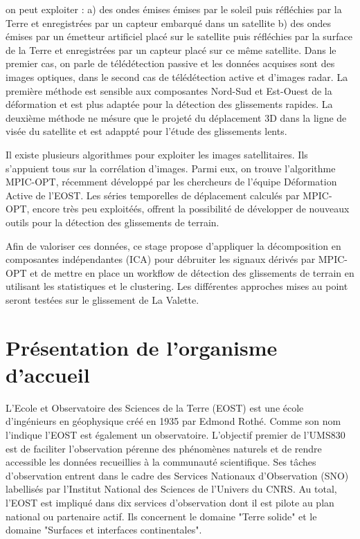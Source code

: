 \documentclass[11pt, openany]{report}
\begin{document}
on peut exploiter : a) des ondes émises émises par le soleil puis réfléchies par la Terre et enregistrées par un capteur embarqué dans un satellite b) des ondes émises par un émetteur artificiel placé sur le satellite puis réfléchies par la surface de la Terre et enregistrées par un capteur placé sur ce même satellite. Dans le premier cas, on parle de télédétection passive et les données acquises sont des images optiques, dans le second cas de télédétection active et d’images radar. La première méthode est sensible aux composantes Nord-Sud et Est-Ouest de la déformation et est plus adaptée pour la détection des glissements rapides. La deuxième méthode ne mésure que le projeté du déplacement 3D dans la ligne de visée du satellite et est adappté pour l'étude des glissements lents.

Il existe plusieurs algorithmes pour exploiter les images satellitaires. Ils s'appuient tous sur la corrélation d'images. Parmi eux, on trouve l'algorithme MPIC-OPT, récemment développé par les chercheurs de l'équipe Déformation Active de l'EOST. Les séries temporelles de déplacement calculés par MPIC-OPT, encore très peu exploitéés, offrent la possibilité de développer de nouveaux outils pour la détection des glissements de terrain.

Afin de valoriser ces données, ce stage propose d'appliquer la décomposition en composantes indépendantes (ICA) pour débruiter les signaux dérivés par MPIC-OPT et de mettre en place un workflow de détection des glissements de terrain en utilisant les statistiques et le clustering. Les différentes approches mises au point seront testées sur le glissement de La Valette.

\chapter{Présentation de l'organisme d'accueil}
L'Ecole et Observatoire des Sciences de la Terre (EOST) est une école d'ingénieurs en géophysique
créé en 1935 par Edmond Rothé. Comme son nom l'indique l'EOST est également un observatoire. L’objectif premier de l’UMS830 est de faciliter l'observation pérenne des phénomènes naturels et de rendre accessible les données recueillies à la communauté scientifique. Ses tâches d'observation entrent dans le cadre des Services Nationaux d'Observation (SNO) labellisés par l'Institut National des Sciences de l'Univers du CNRS. Au total, l'EOST est impliqué dans dix services d'observation dont il est pilote au plan national ou partenaire actif. Ils concernent le domaine "Terre solide" et le domaine "Surfaces et interfaces continentales".
\end{document}
